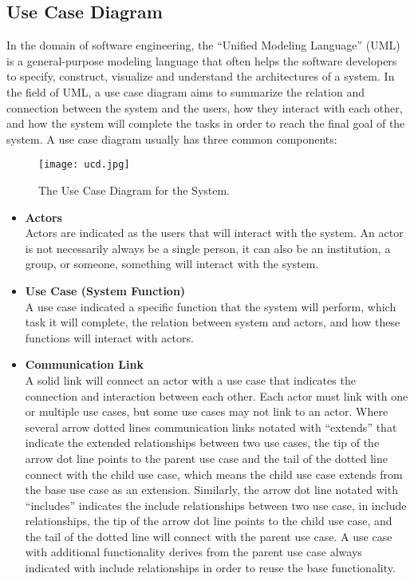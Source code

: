 \documentclass[12pt]{article}
\begin{document}
\subsection{Use Case Diagram}
In the domain of software engineering, the ``Unified Modeling Language'' (UML) is a general-purpose modeling language that often helps the software developers to specify, construct, visualize and understand the architectures of a system. In the field of UML, a use case diagram aims to summarize the relation and connection between the system and the users, how they interact with each other, and how the system will complete the tasks in order to reach the final goal of the system. A use case diagram usually has three common components:
\begin{figure}[ht]
\centering
\texttt{[image: ucd.jpg]}
\caption{The Use Case Diagram for the System.}
\label{fig:label}
\end{figure}
\begin{itemize}
\item\textbf{Actors}
\\Actors are indicated as the users that will interact with the system. An actor is not necessarily always be a single person, it can also be an institution, a group, or someone, something will interact with the system.
\item\textbf{Use Case (System Function)}
\\A use case indicated a specific function that the system will perform, which task it will complete, the relation between system and actors, and how these functions will interact with actors.  
\item\textbf{Communication Link}
\\A solid link will connect an actor with a use case that indicates the connection and interaction between each other. Each actor must link with one or multiple use cases, but some use cases may not link to an actor. Where several arrow dotted lines communication links notated with ``extends'' that indicate the extended relationships between two use cases, the tip of the arrow dot line points to the parent use case and the tail of the dotted line connect with the child use case, which means the child use case extends from the base use case as an extension. Similarly, the arrow dot line notated with ``includes'' indicates the include relationships between two use case, in include relationships, the tip of the arrow dot line points to the child use case, and the tail of the dotted line will connect with the parent use case. A use case with additional functionality derives from the parent use case always indicated with include relationships in order to reuse the base functionality.
\end{itemize}
\end{document}
